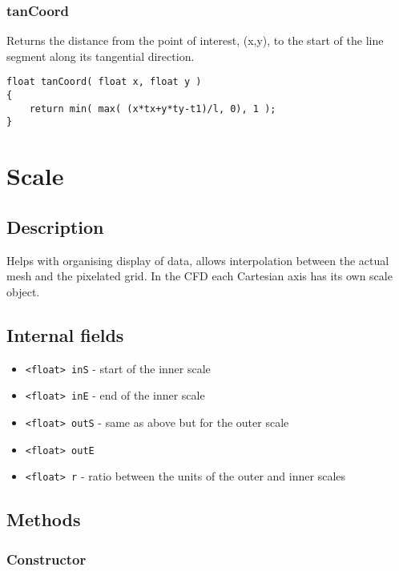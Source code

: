 \documentclass[notitlepage]{article}
\begin{document}
\subsubsection{tanCoord}

Returns the distance from the point of interest, (x,y), to the start of the line segment
along its tangential direction.

\begin{lstlisting}[style=myCpp]
float tanCoord( float x, float y )
{
	return min( max( (x*tx+y*ty-t1)/l, 0), 1 );
}
\end{lstlisting}

\section{Scale}

\subsection{Description}

Helps with organising display of data, allows interpolation between the actual mesh
and the pixelated grid. In the CFD each Cartesian axis has its own scale object.

\subsection{Internal fields}

\begin{itemize}
\item \texttt{<float> inS} - start of the inner scale
\item \texttt{<float> inE} - end of the inner scale
\item \texttt{<float> outS} - same as above but for the outer scale
\item \texttt{<float> outE}
\item \texttt{<float> r} - ratio between the units of the outer and inner scales
\end{itemize}

\subsection{Methods}

\subsubsection{Constructor}
\end{document}
